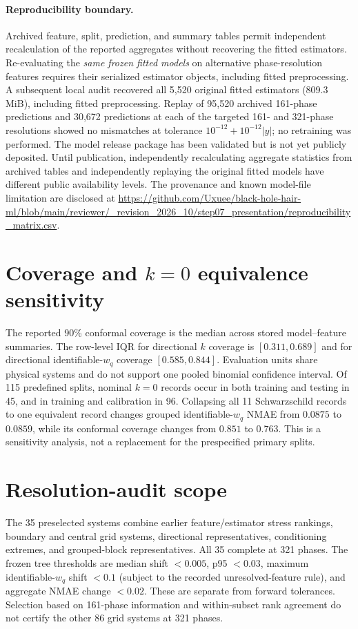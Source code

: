 \documentclass{article}
\begin{document}
\paragraph{Reproducibility boundary.}
Archived feature, split, prediction, and summary tables permit independent recalculation of the reported aggregates without recovering the fitted estimators. Re-evaluating the \emph{same frozen fitted models} on alternative phase-resolution features requires their serialized estimator objects, including fitted preprocessing. A subsequent local audit recovered all 5,520 original fitted estimators (809.3 MiB), including fitted preprocessing. Replay of 95,520 archived 161-phase predictions and 30,672 predictions at each of the targeted 161- and 321-phase resolutions showed no mismatches at tolerance $10^{-12}+10^{-12}|\hat y|$; no retraining was performed. The model release package has been validated but is not yet publicly deposited. Until publication, independently recalculating aggregate statistics from archived tables and independently replaying the original fitted models have different public availability levels. The provenance and known model-file limitation are disclosed at \url{https://github.com/Uxuee/black-hole-hair-ml/blob/main/reviewer/_revision_2026_10/step07_presentation/reproducibility_matrix.csv}.
\enlargethispage{8\baselineskip}
\section{Coverage and $k=0$ equivalence sensitivity}\label{app:coverage}
The reported 90\% conformal coverage is the median across stored model--feature summaries. The row-level IQR for directional $k$ coverage is $[0.311,0.689]$ and for directional identifiable-$w_q$ coverage $[0.585,0.844]$. Evaluation units share physical systems and do not support one pooled binomial confidence interval. Of 115 predefined splits, nominal $k=0$ records occur in both training and testing in 45, and in training and calibration in 96. Collapsing all 11 Schwarzschild records to one equivalent record changes grouped identifiable-$w_q$ NMAE from $0.0875$ to $0.0859$, while its conformal coverage changes from $0.851$ to $0.763$. This is a sensitivity analysis, not a replacement for the prespecified primary splits.
\section{Resolution-audit scope}
The 35 preselected systems combine earlier feature/estimator stress rankings, boundary and central grid systems, directional representatives, conditioning extremes, and grouped-block representatives. All 35 complete at 321 phases. The frozen tree thresholds are median shift $<0.005$, p95 $<0.03$, maximum identifiable-$w_q$ shift $<0.1$ (subject to the recorded unresolved-feature rule), and aggregate NMAE change $<0.02$. These are separate from forward tolerances. Selection based on 161-phase information and within-subset rank agreement do not certify the other 86 grid systems at 321 phases.
\end{document}
